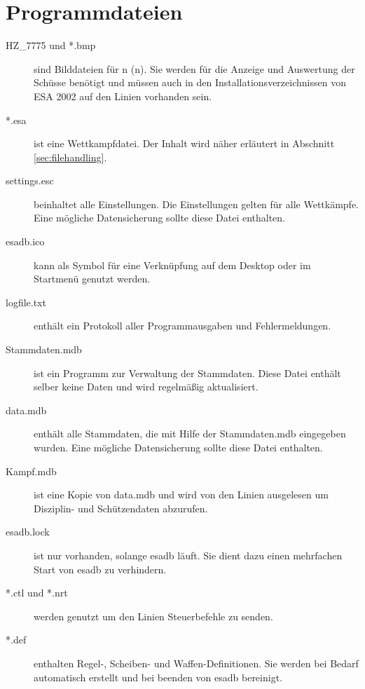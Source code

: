 \section{Programmdateien}
\begin{description}
  \item[HZ\_7775 und *.bmp] sind Bilddateien für n (n).
                           Sie werden für die Anzeige und Auswertung der Schüsse benötigt und müssen auch
                           in den Installationsverzeichnissen von ESA 2002 auf den Linien vorhanden sein.
  \item[*.esa] ist eine Wettkampfdatei. Der Inhalt wird näher erläutert in Abschnitt \ref{sec:filehandling}.
  \item[settings.esc] beinhaltet alle Einstellungen. Die Einstellungen gelten für alle Wettkämpfe.
                      Eine mögliche Datensicherung sollte diese Datei enthalten.
  \item[esadb.ico] kann als Symbol für eine Verknüpfung auf dem Desktop oder im Startmenü genutzt werden.
  \item[logfile.txt] enthält ein Protokoll aller Programmausgaben und Fehlermeldungen.
  \item[Stammdaten.mdb] ist ein Programm zur Verwaltung der Stammdaten. Diese Datei enthält selber keine
                        Daten und wird regelmäßig aktualisiert.
  \item[data.mdb] enthält alle Stammdaten, die mit Hilfe der Stammdaten.mdb eingegeben wurden. Eine mögliche
                  Datensicherung sollte diese Datei enthalten.
  \item[Kampf.mdb] ist eine Kopie von data.mdb und wird von den Linien ausgelesen um Disziplin- und Schützendaten abzurufen.
  \item[esadb.lock] ist nur vorhanden, solange esadb läuft. Sie dient dazu einen mehrfachen Start von esadb zu verhindern.
  \item[*.ctl und *.nrt] werden genutzt um den Linien Steuerbefehle zu senden.
  \item[*.def] enthalten Regel-, Scheiben- und Waffen-Definitionen. Sie werden bei Bedarf automatisch erstellt und
               bei beenden von esadb bereinigt.
\end{description}

